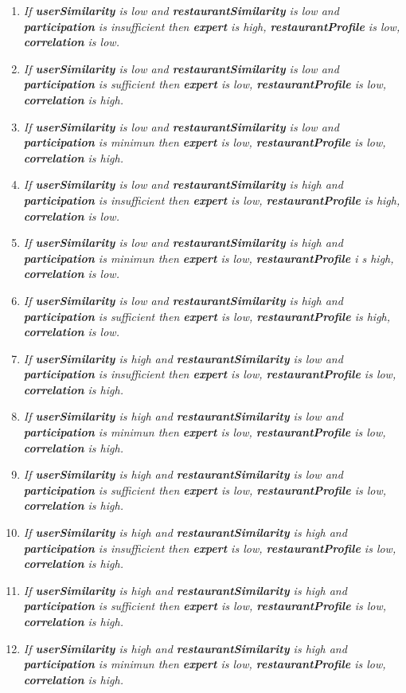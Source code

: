 \begin{enumerate} 
\item \textit{If \textbf{userSimilarity} is low and 
\textbf{restaurantSimilarity} is low and \textbf{participation} 
is insufficient then \textbf{expert} is high, \textbf{restaurantProfile} 
is low, \textbf{correlation} is low.}
\item \textit{If \textbf{userSimilarity} is low and 
\textbf{restaurantSimilarity} is low and \textbf{participation} 
is sufficient then \textbf{expert} is low, \textbf{restaurantProfile} 
is low, \textbf{correlation} is high.}
\item \textit{If \textbf{userSimilarity} is low and 
\textbf{restaurantSimilarity} is low and \textbf{participation} 
is minimun then \textbf{expert} is low, \textbf{restaurantProfile} 
is low, \textbf{correlation} is high.}
\item \textit{If \textbf{userSimilarity} is low and 
\textbf{restaurantSimilarity} is high and \textbf{participation} 
is insufficient then \textbf{expert} is low, \textbf{restaurantProfile} 
is high, \textbf{correlation} is low.}
\item \textit{If \textbf{userSimilarity} is low and 
\textbf{restaurantSimilarity} is high and \textbf{participation} 
is minimun then \textbf{expert} is low, \textbf{restaurantProfile} i
s high, \textbf{correlation} is low.}
\item \textit{If \textbf{userSimilarity} is low and 
\textbf{restaurantSimilarity} is high and \textbf{participation} 
is sufficient then \textbf{expert} is low, \textbf{restaurantProfile} 
is high, \textbf{correlation} is low.}
\item \textit{If \textbf{userSimilarity} is high and 
\textbf{restaurantSimilarity} is low and \textbf{participation} 
is insufficient then \textbf{expert} is low, \textbf{restaurantProfile} 
is low, \textbf{correlation} is high.}
\item \textit{If \textbf{userSimilarity} is high and 
\textbf{restaurantSimilarity} is low and \textbf{participation} 
is minimun then \textbf{expert} is low, \textbf{restaurantProfile} 
is low, \textbf{correlation} is high.}
\item \textit{If \textbf{userSimilarity} is high and 
\textbf{restaurantSimilarity} is low and \textbf{participation} 
is sufficient then \textbf{expert} is low, \textbf{restaurantProfile} 
is low, \textbf{correlation} is high.}
\item \textit{If \textbf{userSimilarity} is high and 
\textbf{restaurantSimilarity} is high and \textbf{participation} 
is insufficient then \textbf{expert} is low, \textbf{restaurantProfile} 
is low, \textbf{correlation} is high.}
\item \textit{If \textbf{userSimilarity} is high and 
\textbf{restaurantSimilarity} is high and \textbf{participation} 
is sufficient then \textbf{expert} is low, \textbf{restaurantProfile} 
is low, \textbf{correlation} is high.}
\item \textit{If \textbf{userSimilarity} is high and 
\textbf{restaurantSimilarity} is high and \textbf{participation} 
is minimun then \textbf{expert} is low, \textbf{restaurantProfile} 
is low, \textbf{correlation} is high.}
\end{enumerate} 
